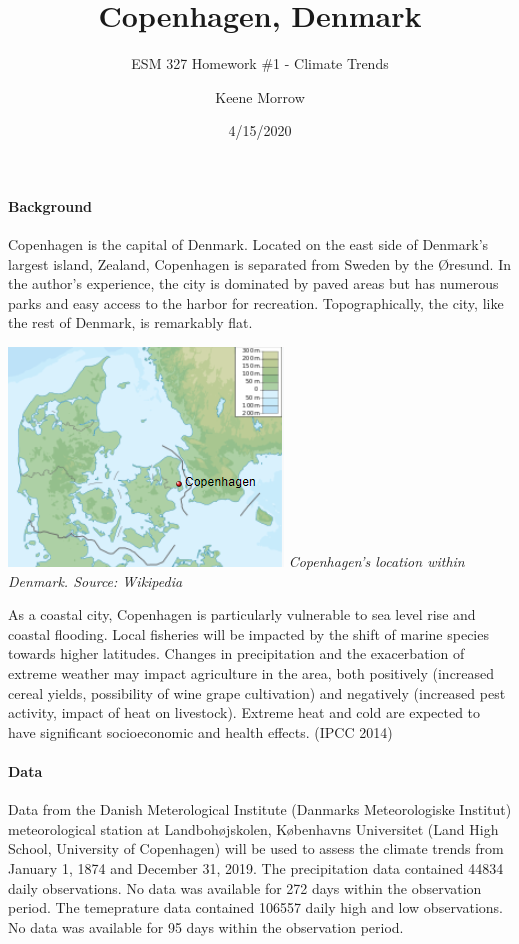 \documentclass[
]{article}
\title{Copenhagen, Denmark}
\subtitle{ESM 327 Homework \#1 - Climate Trends}
\author{Keene Morrow}
\date{4/15/2020}
\let\oldparagraph\paragraph
\renewcommand{\paragraph}[1]{\oldparagraph{#1}\mbox{}}
\begin{document}
\maketitle

\hypertarget{background}{%
\paragraph{Background}\label{background}}

Copenhagen is the capital of Denmark. Located on the east side of
Denmark's largest island, Zealand, Copenhagen is separated from Sweden
by the Øresund. In the author's experience, the city is dominated by
paved areas but has numerous parks and easy access to the harbor for
recreation. Topographically, the city, like the rest of Denmark, is
remarkably flat.

\includegraphics{figures/kbh.png} \emph{Copenhagen's location within
Denmark. Source: Wikipedia}

As a coastal city, Copenhagen is particularly vulnerable to sea level
rise and coastal flooding. Local fisheries will be impacted by the shift
of marine species towards higher latitudes. Changes in precipitation and
the exacerbation of extreme weather may impact agriculture in the area,
both positively (increased cereal yields, possibility of wine grape
cultivation) and negatively (increased pest activity, impact of heat on
livestock). Extreme heat and cold are expected to have significant
socioeconomic and health effects. (IPCC 2014)

\hypertarget{data}{%
\paragraph{Data}\label{data}}

Data from the Danish Meterological Institute (Danmarks Meteorologiske
Institut) meteorological station at Landbohøjskolen, Københavns
Universitet (Land High School, University of Copenhagen) will be used to
assess the climate trends from January 1, 1874 and December 31, 2019.
The precipitation data contained 44834 daily observations. No data was
available for 272 days within the observation period. The temeprature
data contained 106557 daily high and low observations. No data was
available for 95 days within the observation period.
\end{document}
